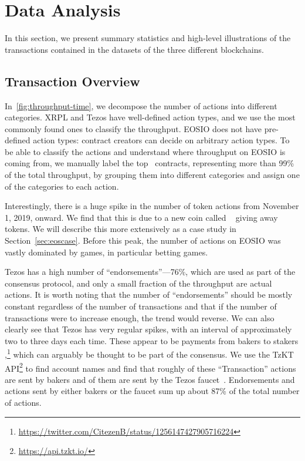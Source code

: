 \section{Data Analysis}
\label{sec:4:data-analysis}
In this section, we present summary statistics and high-level illustrations of the transactions contained in the datasets of the three different blockchains.

\subsection{Transaction Overview}


In~\autoref{fig:throughput-time}, we decompose the number of actions into different categories. XRPL and Tezos have well-defined action types, and we use the most commonly found ones to classify the throughput.
EOSIO does not have pre-defined action types: contract creators can decide on arbitrary action types.
To be able to classify the actions and understand where throughput on EOSIO is coming from, we manually label the top~ contracts, representing more than 99\% of the total throughput, by grouping them into different categories and assign one of the categories to each action.

Interestingly, there is a huge spike in the number of token actions from November 1, 2019, onward. 
We find that this is due to a new coin called ~\cite{Enumivo2019} giving away tokens. 
We will describe this more extensively as a case study in Section~\ref{sec:eoscase}. 
Before this peak, the number of actions on EOSIO was vastly dominated by games, in particular betting games.

Tezos has a high number of ``endorsements''---76\%, which are used as part of the consensus protocol, and only a small fraction of the throughput are actual actions.
It is worth noting that the number of ``endorsements'' should be mostly constant regardless of the number of transactions and that if the number of transactions were to increase enough, the trend would reverse.
We can also clearly see that Tezos has very regular spikes, with an interval of approximately two to three days each time.
These appear to be payments from bakers to stakers \cite{cryptium-labs-payout},\footnote{\url{https://twitter.com/CitezenB/status/1256147427905716224}} which can arguably be thought to be part of the consensus.
We use the TzKT API\footnote{\url{https://api.tzkt.io/}} to find account names and find that roughly  of these ``Transaction'' actions are sent by bakers and  of them are sent by the Tezos faucet~\cite{tezos-faucet}.
Endorsements and actions sent by either bakers or the faucet sum up about 87\% of the total number of actions.

